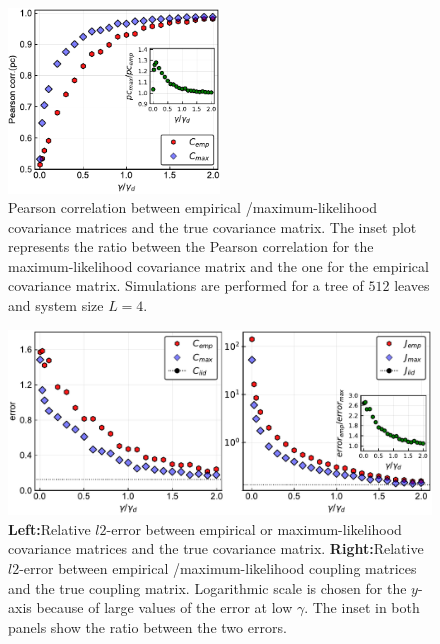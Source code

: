 \documentclass[preprint,amsmath,amssymb,superscriptaddress,showpacs,pre]{revtex4-1}
\begin{document}
\begin{figure}[!htb]
	\centering
	\includegraphics[keepaspectratio=true,width=0.5\textwidth]{Figures/corr_C_L4_balanced_tree_100_rep.pdf}
	\caption{ Pearson correlation between empirical /maximum-likelihood   covariance matrices and the true covariance matrix. The inset plot represents the ratio between the Pearson correlation for the  maximum-likelihood covariance matrix and the one for the empirical covariance matrix. Simulations are performed for a tree of $512$ leaves  and  system size $L=4$.}
	\label{fig:pears_L4}
\end{figure}



\begin{figure}[!htb]
			\centering\includegraphics[keepaspectratio=true,width=1.0\textwidth]{Figures/epsilon_error_L4_balanced_tree_100.pdf}
		\hspace{1mm}
	\caption{\textbf{Left:}Relative $l2$-error between empirical or maximum-likelihood  covariance matrices and the true covariance matrix.  \textbf{Right:}Relative $l2$-error between empirical /maximum-likelihood  coupling matrices and the true coupling matrix. Logarithmic scale is chosen for the $y$-axis because of large values of the error at low $\gamma$. The inset in both panels show the ratio between the two errors.}
	\label{fig:error_1_L4}
\end{figure}
\end{document}

